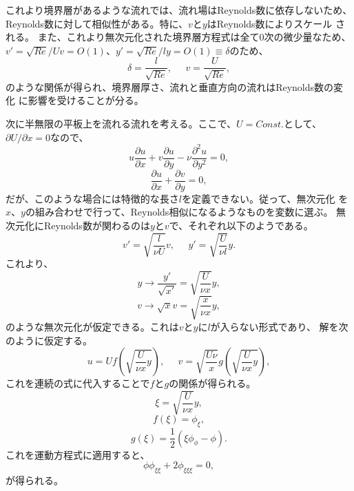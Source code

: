 これより境界層があるような流れでは、流れ場はReynolds数に依存しないため、
Reynolds数に対して相似性がある。特に、$v$と$y$はReynolds数によりスケール
される。
また、これより無次元化された境界層方程式は全て0次の微少量なため、
$v'=\sqrt{Re}/Uv=O(1)$、$y'=\sqrt{Re}/ly=O(1)\equiv \delta$のため、
\begin{equation}
 \delta = \frac{l}{\sqrt{Re}}, \mspace{25mu}
  v = \frac{U}{\sqrt{Re}},
\end{equation}
のような関係が得られ、境界層厚さ、流れと垂直方向の流れはReynolds数の変化
に影響を受けることが分る。

次に半無限の平板上を流れる流れを考える。ここで、$U=Const.$として、
$\partial U/\partial x=0$なので、
\begin{equation}
 u\frac{\partial u}{\partial x}
  + v\frac{\partial u}{\partial y}
  - \nu\frac{\partial^2u}{\partial y^2} = 0,
\end{equation}
\begin{equation}
 \frac{\partial u}{\partial x} 
  +\frac{\partial v}{\partial y} = 0,
\end{equation}
だが、このような場合には特徴的な長さ$l$を定義できない。従って、無次元化
を$x$、$y$の組み合わせで行って、Reynolds相似になるようなものを変数に選ぶ。
無次元化にReynolds数が関わるのは$y$と$v$で、それぞれ以下のようである。
\[
 v' = \sqrt{\frac{l}{\nu U}}v, \mspace{25mu}
 y' = \sqrt{\frac{U}{\nu l}}y.
\]
これより、
\begin{equation}
 y\longrightarrow　\frac{y'}{\sqrt{x'}} = \sqrt{\frac{U}{\nu x}} y,
\end{equation}
\begin{equation}
 v\longrightarrow \sqrt{x}v = \sqrt{\frac{x}{\nu x}}y,
\end{equation}
のような無次元化が仮定できる。これは$v$と$y$に$l$が入らない形式であり、
解を次のように仮定する。
\begin{equation}
 u = U f \left(\sqrt{\frac{U}{\nu x}y}\right), \mspace{25mu}
  v = \sqrt{\frac{U \nu}{x}} g \left(\sqrt{\frac{U}{\nu x}y}\right),
\end{equation}
これを連続の式に代入することで$f$と$g$の関係が得られる。
\begin{equation}
 \xi = \sqrt{\frac{U}{\nu x}}y,
\end{equation}
\begin{equation}
 f(\xi) = \phi_{\xi},
\end{equation}
\begin{equation}
 g(\xi) = \frac{1}{2}\left(\xi \phi_{\phi} - \phi\right).
\end{equation}
 これを運動方程式に適用すると、
\begin{equation}
 \phi\phi_{\xi\xi} + 2\phi_{\xi\xi\xi} = 0,
\end{equation}
 が得られる。

